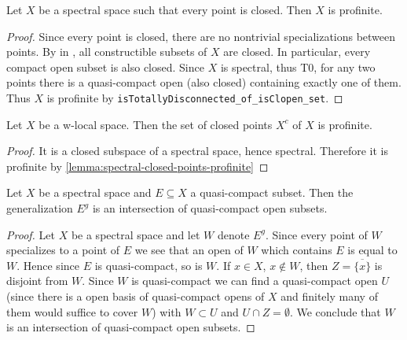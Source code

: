 \begin{lemma}
  Let $X$ be a spectral space such that every point is closed. Then $X$ is profinite.
  \label{lemma:spectral-closed-points-profinite}
  \leanok
\end{lemma}

\begin{proof}
  \leanok
  Since every point is closed, there are no nontrivial specializations between points. By  in , all constructible subsets of $X$ are closed. In particular, every compact open subset is also closed. Since $X$ is spectral, thus T0, for any two points there is a quasi-compact open (also closed) containing exactly one of them. Thus $X$ is profinite by \verb`isTotallyDisconnected_of_isClopen_set`.
\end{proof}

\begin{lemma}
    Let $X$ be a w-local space. Then the set of closed points $X^c$ of $X$ is profinite.
    \label{lemma:w-local-closed-points-profinite}
    \leanok
\end{lemma}

\begin{proof}
    \leanok
    It is a closed subspace of a spectral space, hence spectral. Therefore it is profinite by
    \ref{lemma:spectral-closed-points-profinite}
\end{proof}

\begin{lemma}
  Let $X$ be a spectral space and $E \subseteq X$ a quasi-compact subset. Then the generalization $E^g$ is an intersection of quasi-compact open subsets.
  \label{lemma:spectral-generalization-intersection-open}
  \leanok
\end{lemma}

\begin{proof}
  \leanok
  Let $X$ be a spectral space and let $W$ denote $E^g$. Since every point of $W$ specializes to a point of $E$ we see that an open of $W$ which contains $E$ is equal to $W$. Hence since $E$ is quasi-compact, so is $W$. If $x \in X$, $x \notin W$, then $Z = \overline{\{x\}}$ is disjoint from $W$. Since $W$ is quasi-compact we can find a quasi-compact open $U$ (since there is a open basis of quasi-compact opens of $X$ and finitely many of them would suffice to cover $W$) with $W \subset U$ and $U \cap Z = \emptyset$. We conclude that $W$ is an intersection of quasi-compact open subsets.
\end{proof}

